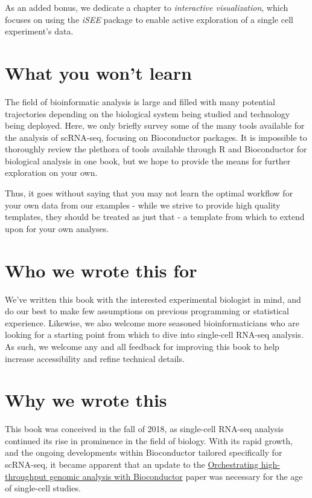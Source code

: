 \documentclass[]{book}
\begin{document}
As an added bonus, we dedicate a chapter to \emph{interactive visualization}, which focuses on using the \emph{iSEE} package to enable active exploration of a single cell experiment's data.

\hypertarget{what-you-wont-learn}{%
\section{What you won't learn}\label{what-you-wont-learn}}

The field of bioinformatic analysis is large and filled with many potential trajectories depending on the biological system being studied and technology being deployed. Here, we only briefly survey some of the many tools available for the analysis of scRNA-seq, focusing on Bioconductor packages. It is impossible to thoroughly review the plethora of tools available through R and Bioconductor for biological analysis in one book, but we hope to provide the means for further exploration on your own.

Thus, it goes without saying that you may not learn the optimal workflow for your own data from our examples - while we strive to provide high quality templates, they should be treated as just that - a template from which to extend upon for your own analyses.

\hypertarget{who-we-wrote-this-for}{%
\section{Who we wrote this for}\label{who-we-wrote-this-for}}

We've written this book with the interested experimental biologist in mind, and do our best to make few assumptions on previous programming or statistical experience. Likewise, we also welcome more seasoned bioinformaticians who are looking for a starting point from which to dive into single-cell RNA-seq analysis. As such, we welcome any and all feedback for improving this book to help increase accessibility and refine technical details.

\hypertarget{why-we-wrote-this}{%
\section{Why we wrote this}\label{why-we-wrote-this}}

This book was conceived in the fall of 2018, as single-cell RNA-seq analysis continued its rise in prominence in the field of biology. With its rapid growth, and the ongoing developments within Bioconductor tailored specifically for scRNA-seq, it became apparent that an update to the \href{https://www.nature.com/articles/nmeth.3252}{Orchestrating high-throughput genomic analysis with Bioconductor} paper was necessary for the age of single-cell studies.
\end{document}
